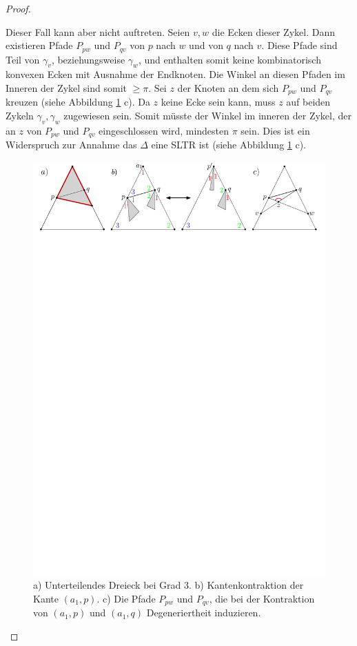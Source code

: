 \begin{proof}
\begin{description}[leftmargin =0pt, font = \rmfamily,listparindent=\parindent,parsep=0pt]
Dieser Fall kann aber nicht auftreten. Seien $v,w$ die Ecken dieser Zykel. Dann existieren Pfade $P_{pw}$ und $P_{qv}$ von $p$ nach $w$ und von $q$ nach $v$. Diese Pfade sind Teil von $\gamma_v$, beziehungsweise $\gamma_w$, und enthalten somit keine kombinatorisch konvexen Ecken mit Ausnahme der Endknoten. Die Winkel an diesen Pfaden im Inneren der Zykel sind somit $\geq \pi$. Sei $z$ der Knoten an dem sich $P_{pw}$ und $P_{qv}$ kreuzen (siehe Abbildung \ref{pic_lem3_1} c). Da $z$ keine Ecke sein kann, muss $z$ auf beiden Zykeln $\gamma_v,\gamma_w$  zugewiesen sein. Somit müsste der Winkel im inneren der Zykel, der an $z$ von $P_{pw}$ und $P_{qv}$ eingeschlossen wird, mindesten $\pi$ sein. Dies ist ein Widerspruch zur Annahme das $\Delta$ eine SLTR ist (siehe Abbildung \ref{pic_lem3_1} c).

\begin{figure}
	\centering
	  \includegraphics[width=1\textwidth]{lem3_1.pdf}
    	\caption{a) Unterteilendes Dreieck bei Grad 3. b) Kantenkontraktion der Kante $(a_1,p)$. c) Die Pfade $P_{pw}$ und $P_{qv}$, die bei der Kontraktion von $(a_1,p)$ und $(a_1,q)$ Degeneriertheit induzieren.}
    	\label{pic_lem3_1}
\end{figure}


\end{description}
\end{proof}
